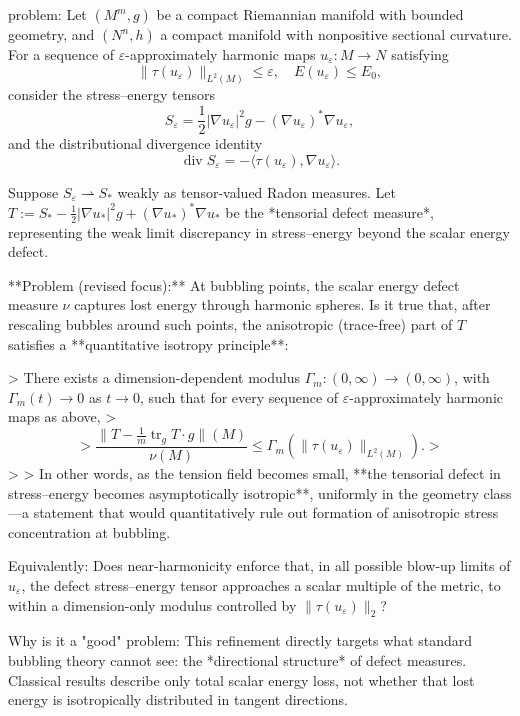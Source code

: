 problem:  
Let \( (M^m,g) \) be a compact Riemannian manifold with bounded geometry, and \( (N^n,h) \) a compact manifold with nonpositive sectional curvature.  
For a sequence of \( \varepsilon\)-approximately harmonic maps \(u_\varepsilon : M \to N\) satisfying  
\[
\|\tau(u_\varepsilon)\|_{L^2(M)} \le \varepsilon, \quad E(u_\varepsilon)\le E_0,
\]  
consider the stress–energy tensors  
\[
S_\varepsilon = \frac12 |\nabla u_\varepsilon|^2 g - (\nabla u_\varepsilon)^{\!*}\nabla u_\varepsilon,
\]
and the distributional divergence identity
\[
\operatorname{div} S_\varepsilon = -\langle \tau(u_\varepsilon),\nabla u_\varepsilon\rangle.
\]

Suppose \( S_\varepsilon \rightharpoonup S_* \) weakly as tensor-valued Radon measures. Let  
\(T := S_* - \tfrac12|\nabla u_*|^2 g + (\nabla u_*)^{\!*}\nabla u_*\)  
be the *tensorial defect measure*, representing the weak limit discrepancy in stress–energy beyond the scalar energy defect.

**Problem (revised focus):**  
At bubbling points, the scalar energy defect measure \(\nu\) captures lost energy through harmonic spheres.  Is it true that, after rescaling bubbles around such points,  
the anisotropic (trace-free) part of \(T\) satisfies a **quantitative isotropy principle**:

> There exists a dimension-dependent modulus \( \Gamma_m:(0,\infty)\to(0,\infty)\), with \(\Gamma_m(t)\to0\) as \(t\to0\), such that for every sequence of \( \varepsilon\)-approximately harmonic maps as above,
> \[
> \frac{\|T - \tfrac{1}{m}\operatorname{tr}_g T\cdot g\|(M)}{\nu(M)} \le \Gamma_m( \|\tau(u_\varepsilon)\|_{L^2(M)} ).
> \]
> 
> In other words, as the tension field becomes small, **the tensorial defect in stress–energy becomes asymptotically isotropic**, uniformly in the geometry class—a statement that would quantitatively rule out formation of anisotropic stress concentration at bubbling.

Equivalently: Does near-harmonicity enforce that, in all possible blow-up limits of \(u_\varepsilon\), the defect stress–energy tensor approaches a scalar multiple of the metric, to within a dimension-only modulus controlled by \( \|\tau(u_\varepsilon)\|_2 \)?  

Why is it a "good" problem:  
This refinement directly targets what standard bubbling theory cannot see: the *directional structure* of defect measures. Classical results describe only total scalar energy loss, not whether that lost energy is isotropically distributed in tangent directions.  

